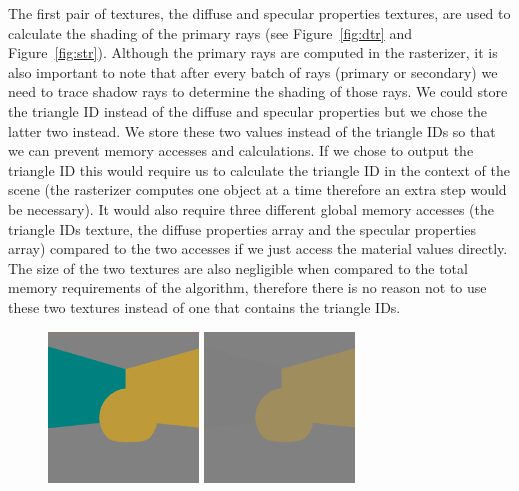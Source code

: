 The first pair of textures, the diffuse and specular properties textures, are used to calculate the shading of the primary rays (see Figure~\ref{fig:dtr} and Figure~\ref{fig:str}). Although the primary rays are computed in the rasterizer, it is also important to note that after every batch of rays (primary or secondary) we need to trace shadow rays to determine the shading of those rays. We could store the triangle ID instead of the diffuse and specular properties but we chose the latter two instead. We store these two values instead of the triangle IDs so that we can prevent memory accesses and calculations. If we chose to output the triangle ID this would require us to calculate the triangle ID in the context of the scene (the rasterizer computes one object at a time therefore an extra step would be necessary). It would also require three different global memory accesses (the triangle IDs texture, the diffuse properties array and the specular properties array) compared to the two accesses if we just access the material values directly. The size of the two textures are also negligible when compared to the total memory requirements of the algorithm, therefore there is no reason not to use these two textures instead of one that contains the triangle IDs.

\begin{figure}[!htb]
    \begin{minipage}{0.475\linewidth}
        \centering
        \includegraphics[width=4.0cm]{Images/Diffuse_Texture}
    \end{minipage}
    \begin{minipage}{0.475\linewidth}
        \centering
        \includegraphics[width=4.0cm]{Images/Specular_Texture}
    \end{minipage}
\end{figure}

